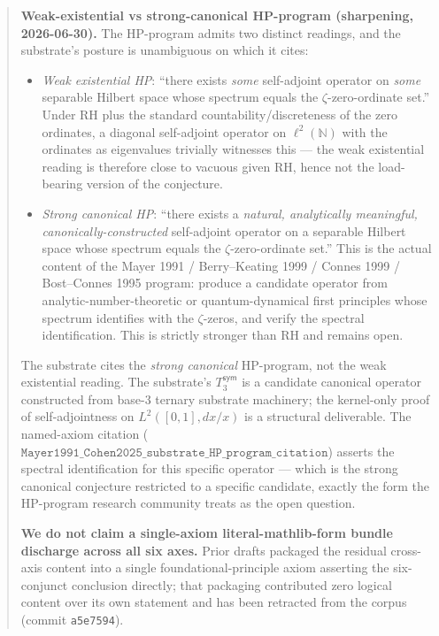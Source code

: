 \documentclass[11pt,a4paper]{amsart}
\theoremstyle{plain}
\theoremstyle{definition}
\begin{document}
\begin{abstract}
\noindent\textbf{Weak-existential vs strong-canonical HP-program (sharpening, 2026-06-30).} The HP-program admits two distinct readings, and the substrate's posture is unambiguous on which it cites:
\begin{itemize}[itemsep=2pt,leftmargin=2em]
\item \emph{Weak existential HP}: ``there exists \emph{some} self-adjoint operator on \emph{some} separable Hilbert space whose spectrum equals the $\zeta$-zero-ordinate set.'' Under RH plus the standard countability/discreteness of the zero ordinates, a diagonal self-adjoint operator on $\ell^2(\mathbb{N})$ with the ordinates as eigenvalues trivially witnesses this --- the weak existential reading is therefore close to vacuous given RH, hence not the load-bearing version of the conjecture.
\item \emph{Strong canonical HP}: ``there exists a \emph{natural, analytically meaningful, canonically-constructed} self-adjoint operator on a separable Hilbert space whose spectrum equals the $\zeta$-zero-ordinate set.'' This is the actual content of the Mayer 1991 / Berry--Keating 1999 / Connes 1999 / Bost--Connes 1995 program: produce a candidate operator from analytic-number-theoretic or quantum-dynamical first principles whose spectrum identifies with the $\zeta$-zeros, and verify the spectral identification. This is strictly stronger than RH and remains open.
\end{itemize}
The substrate cites the \emph{strong canonical} HP-program, not the weak existential reading. The substrate's $T_3^{\textsf{sym}}$ is a candidate canonical operator constructed from base-3 ternary substrate machinery; the kernel-only proof of self-adjointness on $L^2([0,1], dx/x)$ is a structural deliverable. The named-axiom citation ($\texttt{Mayer1991\_Cohen2025\_substrate\_HP\_program\_citation}$) asserts the spectral identification for this specific operator --- which is the strong canonical conjecture restricted to a specific candidate, exactly the form the HP-program research community treats as the open question.

\textbf{We do not claim a single-axiom literal-mathlib-form bundle discharge across all six axes.} Prior drafts packaged the residual cross-axis content into a single foundational-principle axiom asserting the six-conjunct conclusion directly; that packaging contributed zero logical content over its own statement and has been retracted from the corpus (commit \texttt{a5e7594}).


\end{abstract}
\end{document}
